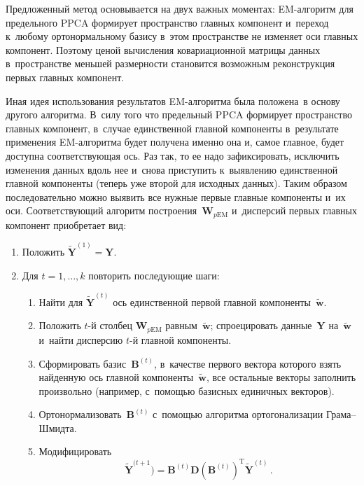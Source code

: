 \begin{multicols}{2}
     Предложенный метод основывается на двух важных моментах:  
EM-ал\-го\-ритм для предельного PPCA формирует пространство главных 
компонент и~переход к~любому ортонормальному базису в~этом пространстве 
не изменяет оси главных компонент. Поэтому ценой вычисления 
ковариационной мат\-ри\-цы данных в~пространстве меньшей раз\-мер\-ности 
становится возможным реконструкция первых главных компонент.
     
     Иная идея использования результатов EM-ал\-го\-рит\-ма была 
положена~в основу другого алгоритма. В~силу того что предельный PPCA 
формирует пространство главных компонент, в~случае единственной главной 
компоненты в~результате применения EM-ал\-го\-рит\-ма будет получена 
именно она и, самое главное, будет доступна соответствующая ось. Раз так, то 
ее надо зафиксировать, исключить изменения данных вдоль нее и~снова 
приступить к~выявлению единственной главной компоненты (теперь уже 
второй для исходных данных). Таким образом последовательно можно выявить 
все нужные первые главные компоненты и~их оси. Соответствующий алгоритм 
построения~$\mathbf{W}_{p\mathrm{EM}}$ и~дис\-пер\-сий первых главных компонент 
приобретает вид:
     \begin{enumerate}[1.]
\item Положить $\tilde{\mathbf{Y}}^{(1)}= \mathbf{Y}$.
\item Для $t=1,\ldots, k$ повторить последующие шаги:
\begin{enumerate}[{2}.1.]
\item Найти для $\tilde{\mathbf{Y}}^{(t)}$ ось единственной первой главной 
компоненты~$\tilde{\mathbf{w}}$.
\item Положить $t$-й столбец $\mathbf{W}_{p\mathrm{EM}}$ 
равным~$\tilde{\mathbf{w}}$; спроецировать данные~$\mathbf{Y}$ 
на~$\tilde{\mathbf{w}}$ и~найти дисперсию $t$-й главной компоненты.
\item Сформировать базис~$\mathbf{B}^{(t)}$, в~качестве первого вектора 
которого взять найденную ось главной компоненты~$\tilde{\mathbf{w}}$, 
все остальные векторы заполнить произвольно (например, с~по\-мощью 
базисных единичных векторов).
\item Ортонормализовать~$\mathbf{B}^{(t)}$ с~по\-мощью алгоритма 
ортогонализации Гра\-ма--Шмидта.
\item Модифицировать 
$$
\tilde{\mathbf{Y}}^{(t+1})= \mathbf{B}^{(t)} 
\mathbf{D}\left(\mathbf{B}^{(t)}\right)^{\mathrm{T}} 
\tilde{\mathbf{Y}}^{(t)}\,.
$$
\end{enumerate}
\end{enumerate}



\end{multicols}
